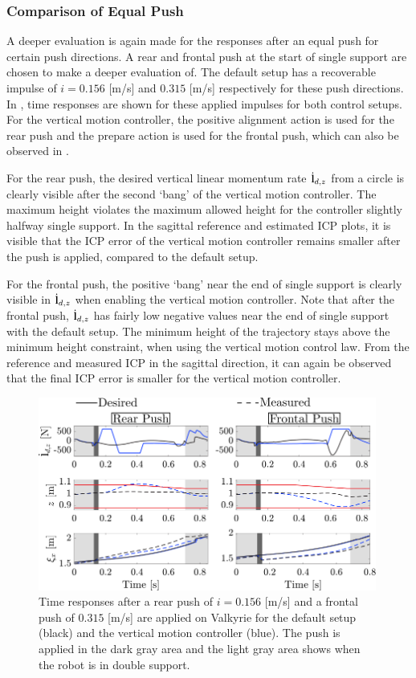 \subsubsection{Comparison of Equal Push} 
A deeper evaluation is again made for the responses after an equal push for certain push directions. A rear and frontal push at the start of single support are chosen to make a deeper evaluation of. The default setup has a recoverable impulse of $i=0.156$ [m/s] and $0.315$ [m/s] respectively for these push directions. In , time responses are shown for these applied impulses for both control setups. For the vertical motion controller, the positive alignment action is used for the rear push and the prepare action is used for the frontal push, which can also be observed in . 

For the rear push, the desired vertical linear momentum rate $\dot{\mathbf{l}}_{d,z}$ from a circle is clearly visible after the second `bang' of the vertical motion controller. The maximum height violates the maximum allowed height for the controller slightly halfway single support. In the sagittal reference and estimated \ac{ICP} plots, it is visible that the \ac{ICP} error of the vertical motion controller remains smaller after the push is applied, compared to the default setup.

For the frontal push, the positive `bang' near the end of single support is clearly visible in $\dot{\mathbf{l}}_{d,z}$ when enabling the vertical motion controller. Note that after the frontal push, $\dot{\mathbf{l}}_{d,z}$ has fairly low negative values near the end of single support with the default setup. The minimum height of the trajectory stays above the minimum height constraint, when using the vertical motion control law. From the reference and measured \ac{ICP} in the sagittal direction, it can again be observed that the final \ac{ICP} error is smaller for the vertical motion controller.
\begin{figure}
     \centering
        \includegraphics[width=0.99\textwidth]{STYLESTUFF/walkplot.png}
    \caption{Time responses after a rear push of $i=0.156$ [m/s] and a frontal push of $0.315$ [m/s] are applied on Valkyrie for the default setup (black) and the vertical motion controller (blue). The push is applied in the dark gray area and the light gray area shows when the robot is in double support.}
    \label{fig:walkplot}
\end{figure}


